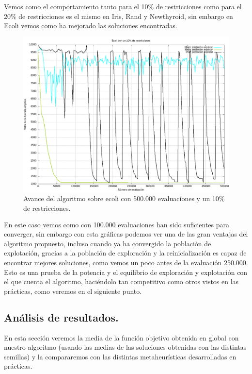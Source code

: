 \documentclass[12pt, spanish]{article}
\begin{document}
Vemos como el comportamiento tanto para el 10\% de restricciones como para el 20\% de restricciones es el mismo en Iris, Rand y Newthyroid, sin embargo en Ecoli vemos como ha mejorado las soluciones encontradas.

\begin{figure}[H]
	\centering
	\includegraphics[scale = 0.5]{ecoli_2.png}
	
	\caption{Avance del algoritmo sobre ecoli con 500.000 evaluaciones y un 10\% de restricciones.}
	\label{fig:ecoli_2}
\end{figure}

En este caso vemos como con 100.000 evaluaciones han sido suficientes para converger, sin embargo con esta gráficas podemos ver una de las gran ventajas del algoritmo propuesto, incluso cuando ya ha convergido la población de explotación, gracias a la población de exploración y la reinicialización es capaz de encontrar mejores soluciones, como vemos un poco antes de la evaluación 250.000. Esto es una prueba de la potencia y el equilibrio de exploración y explotación con el que cuenta el algoritmo, haciéndolo tan competitivo como otros vistos en las prácticas, como veremos en el siguiente punto.

\subsection{Análisis de resultados.	}

En esta sección veremos la media de la función objetivo obtenida en global con nuestro algoritmo (usando las medias de las soluciones obtenidas con las distintas semillas) y la compararemos con las distintas metaheurísticas desarrolladas en prácticas.
\end{document}
